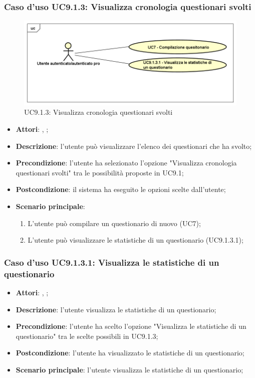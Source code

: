 		\subsubsection{Caso d'uso UC9.1.3: Visualizza cronologia questionari svolti}
		\label{UC9.1.3}
		\begin{figure}[h]
			\centering
			\includegraphics[scale=0.5,keepaspectratio]{UML/UC9_1_3.png}
			\caption{UC9.1.3: Visualizza cronologia questionari svolti}
		\end{figure}
		\FloatBarrier
		\begin{itemize}
			\item \textbf{Attori}: \uau, \uaupro;
			\item \textbf{Descrizione}: l'utente può visualizzare l'elenco dei questionari che ha svolto;
			\item \textbf{Precondizione}: l'utente ha selezionato l'opzione "Visualizza cronologia questionari svolti" tra le possibilità proposte in UC9.1;
			\item \textbf{Postcondizione}: il sistema ha eseguito le opzioni scelte dall'utente;
			\item \textbf{Scenario principale}: 
			\begin{enumerate}
				\item L'utente può compilare un questionario di nuovo (UC7);
				\item L'utente può visualizzare le statistiche di un questionario (UC9.1.3.1);
			\end{enumerate}
		\end{itemize}
		
				\subsubsection{Caso d'uso UC9.1.3.1: Visualizza le statistiche di un questionario}
				\label{UC9.1.3.1}
				\begin{itemize}
					\item \textbf{Attori}: \uau, \uaupro; 
					\item \textbf{Descrizione}: l'utente visualizza le statistiche di un questionario;
					\item \textbf{Precondizione}: l'utente ha scelto l'opzione "Visualizza le statistiche di un questionario" tra le scelte possibili in UC9.1.3;
					\item \textbf{Postcondizione}: l'utente ha visualizzato le statistiche di un questionario; 
					\item \textbf{Scenario principale}: l'utente visualizza le statistiche di un questionario;
				\end{itemize}
										

